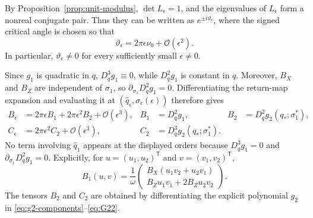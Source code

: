 \documentclass[11pt]{amsart}
\theoremstyle{remark}
\newcommand{\cO}{\mathcal{O}}
\begin{document}
By Proposition~\ref{prop:unit-modulus}, \(\det L_\epsilon=1\), and the
eigenvalues of \(L_\epsilon\) form a nonreal conjugate pair.  Thus they can
be written as \(e^{\pm i\vartheta_\epsilon}\), where the signed critical angle
is chosen so that
\begin{equation}\label{eq:theta-epsilon}
 \vartheta_\epsilon=2\pi\epsilon\nu_0+\cO(\epsilon^2).
\end{equation}
In particular, \(\vartheta_\epsilon\ne0\) for every sufficiently small
\(\epsilon\ne0\).

Since \(g_1\) is quadratic in \(q\), \(D_q^3g_1\equiv0\), while
\(D_q^2g_1\) is constant in \(q\).  Moreover, \(B_X\) and \(B_Z\) are
independent of \(\sigma_1\), so
\(\partial_{\sigma_1}D_q^2g_1=0\).  Differentiating the return-map expansion
and evaluating it at \((\widehat q_\epsilon,\sigma_c(\epsilon))\) therefore
gives
\begin{equation}\label{eq:BC-epsilon}
\begin{aligned}
B_\epsilon&=2\pi\epsilon B_1+2\pi\epsilon^2B_2+\cO(\epsilon^3),
&
B_1&=D_q^2g_1,
&
B_2&=D_q^2g_2(q_*;\sigma_1^*),\\
C_\epsilon&=2\pi\epsilon^2C_2+\cO(\epsilon^3),
&
C_2&=D_q^3g_2(q_*;\sigma_1^*).
\end{aligned}
\end{equation}
No term involving \(\widehat q_1\) appears at the displayed orders because
\(D_q^3g_1=0\) and \(\partial_{\sigma_1}D_q^2g_1=0\).  Explicitly, for
\(u=(u_1,u_2)^{\mathsf T}\) and \(v=(v_1,v_2)^{\mathsf T}\),
\[
B_1(u,v)=\frac1\omega
\begin{pmatrix}
B_X(u_1v_2+u_2v_1)\\
B_Zu_1v_1+2B_Zu_2v_2
\end{pmatrix}.
\]
The tensors \(B_2\) and \(C_2\) are obtained by differentiating the explicit
polynomial \(g_2\) in \eqref{eq:g2-components}--\eqref{eq:G22}.
\end{document}
